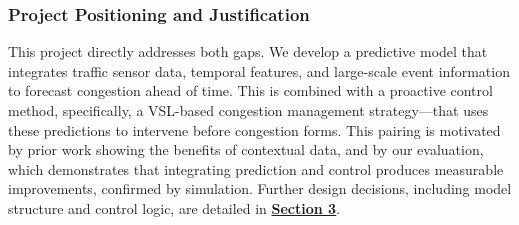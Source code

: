 \subsubsection{Project Positioning and Justification}
This project directly addresses both gaps. We develop a predictive model that integrates traffic sensor data, temporal features, and large-scale event information to forecast congestion ahead of time. This is combined with a proactive control method, specifically, a VSL-based congestion management strategy—that uses these predictions to intervene before congestion forms. This pairing is motivated by prior work showing the benefits of contextual data, and by our evaluation, which demonstrates that integrating prediction and control produces measurable improvements, confirmed by simulation. Further design decisions, including model structure and control logic, are detailed in \textbf{\hyperref[sec:design-implementation]{Section 3}}.


